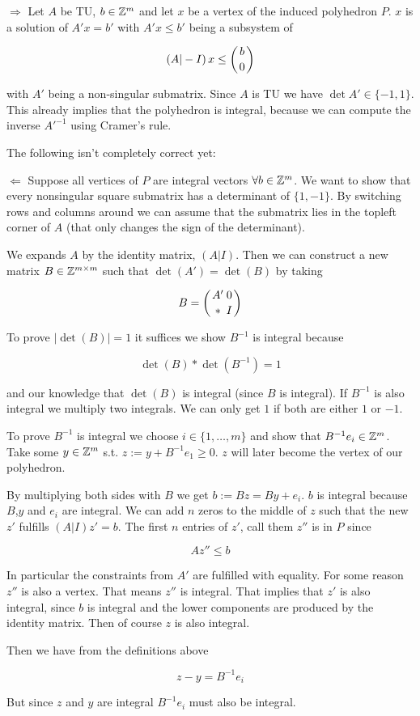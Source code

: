 \begin{pr} $\Rightarrow$ Let $A$ be TU, $b\in \mathbb{Z}^m$ and let $x$ be a vertex of the induced polyhedron $P$. $x$ is a solution of $A'x=b'$ with $A'x\leq b'$ being a subsystem of 

\[\left(A|-I\right) x \leq \left(b\atop 0\right)\]

with $A'$ being a non-singular submatrix. Since $A$ is TU we have $\det A'\in \{-1,1\}$. This already implies that the polyhedron is integral, because we can compute the inverse $A'^{-1}$ using Cramer's rule. %


The following isn't completely correct yet:

$\Leftarrow$ Suppose all vertices of $P$ are integral vectors $\forall b\in \mathbb{Z}^m$. We want to show that every nonsingular square submatrix has a determinant of $\{1,-1\}$. By switching rows and columns around we can assume that the submatrix lies in the topleft corner of $A$ (that only changes the sign of the determinant). 

We expands $A$ by the identity matrix, $(A|I)$. Then we can construct a new matrix $B\in \mathbb{Z}^{m\times m}$ such that $\det (A') = \det (B)$ by taking 


\[B = \left({A' \atop *} {0\atop I}\right)\]

To prove $|\det (B)| =1$ it suffices we show $B^{-1}$ is integral because

\[\det(B)*\det(B^{-1}) = 1\]

and our knowledge that $\det (B)$ is integral (since $B$ is integral). If $B^{-1}$ is also integral we multiply two integrals. We can only get $1$ if both are either $1$ or $-1$.

To prove $B^{-1}$ is integral we choose $i\in \{1,\ldots, m\}$ and show that $B^{-1}e_i\in \mathbb{Z}^m$. Take some $y\in \mathbb{Z}^m$ s.t. $z:= y + B^{-1}e_1\geq 0$. $z$ will later become the vertex of our polyhedron. 

By multiplying both sides with $B$ we get $b:= Bz=By+e_i$. $b$ is integral because $B$,$y$ and $e_i$ are integral. We can add $n$ zeros to the middle of $z$ such that the new $z'$ fulfills $(A|I)z'=b$. The first $n$ entries of $z'$, call them $z''$ is in $P$ since

\[Az''\leq b\]

In particular the constraints from $A'$ are fulfilled with equality. For some reason $z''$ is also a vertex. That means $z''$ is integral. That implies that $z'$ is also integral, since $b$ is integral and the lower components are produced by the identity matrix. Then of course $z$ is also integral.

Then we have from the definitions above

\[z-y=B^{-1}e_i\]

But since $z$ and $y$ are integral $B^{-1}e_i$ must also be integral.

\end{pr}


